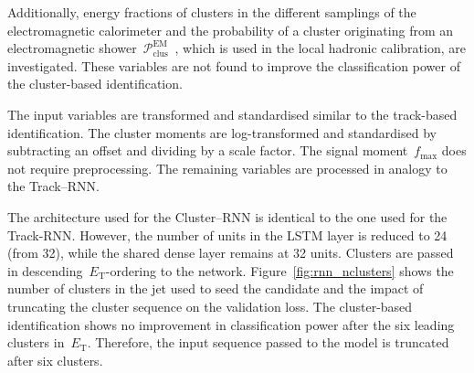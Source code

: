 Additionally, energy fractions of clusters in the different samplings of the
electromagnetic calorimeter and the probability of a cluster originating from an
electromagnetic
shower~$\mathcal{P}_\text{clus}^\text{EM}$~\cite{atlas_topoclustering}, which is
used in the local hadronic calibration, are investigated. These variables are
not found to improve the classification power of the cluster-based
identification.

The input variables are transformed and standardised similar to the track-based
identification. The cluster moments are log-transformed and standardised by
subtracting an offset and dividing by a scale factor. The signal
moment~$f_\text{max}$ does not require preprocessing. The remaining variables
are processed in analogy to the Track--RNN.

The architecture used for the Cluster--RNN is identical to the one used for the
Track-RNN. However, the number of units in the LSTM layer is reduced to 24 (from
32), while the shared dense layer remains at 32 units. Clusters are passed in
descending~$E_\text{T}$-ordering to the network. Figure~\ref{fig:rnn_nclusters}
shows the number of clusters in the jet used to seed the \tauhadvis candidate
and the impact of truncating the cluster sequence on the validation loss. The
cluster-based identification shows no improvement in classification power after
the six leading clusters in~$E_\text{T}$. Therefore, the input sequence passed
to the model is truncated after six clusters.


